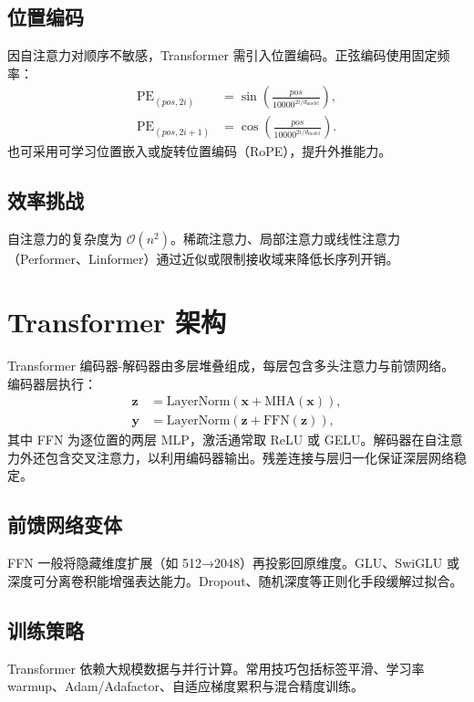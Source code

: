 ﻿\documentclass[UTF8,zihao=-4]{ctexart}
\begin{document}
\subsection{位置编码}
因自注意力对顺序不敏感，Transformer 需引入位置编码。正弦编码使用固定频率：
\begin{align}
  \mathrm{PE}_{(pos, 2i)} &= \sin\left( \frac{pos}{10000^{2i/d_{\text{model}}}} \right), \\
  \mathrm{PE}_{(pos, 2i+1)} &= \cos\left( \frac{pos}{10000^{2i/d_{\text{model}}}} \right).
\end{align}
也可采用可学习位置嵌入或旋转位置编码（RoPE），提升外推能力。

\subsection{效率挑战}
自注意力的复杂度为 $\mathcal{O}(n^2)$。稀疏注意力、局部注意力或线性注意力（Performer、Linformer）通过近似或限制接收域来降低长序列开销。

\section{Transformer 架构}
Transformer 编码器-解码器由多层堆叠组成，每层包含多头注意力与前馈网络。编码器层执行：
\begin{align}
  \mathbf{z} &= \mathrm{LayerNorm}(\mathbf{x} + \mathrm{MHA}(\mathbf{x})), \\
  \mathbf{y} &= \mathrm{LayerNorm}(\mathbf{z} + \mathrm{FFN}(\mathbf{z})),
\end{align}
其中 FFN 为逐位置的两层 MLP，激活通常取 ReLU 或 GELU。解码器在自注意力外还包含交叉注意力，以利用编码器输出。残差连接与层归一化保证深层网络稳定。

\subsection{前馈网络变体}
FFN 一般将隐藏维度扩展（如 512→2048）再投影回原维度。GLU、SwiGLU 或深度可分离卷积能增强表达能力。Dropout、随机深度等正则化手段缓解过拟合。

\subsection{训练策略}
Transformer 依赖大规模数据与并行计算。常用技巧包括标签平滑、学习率 warmup、Adam/Adafactor、自适应梯度累积与混合精度训练。
\end{document}
